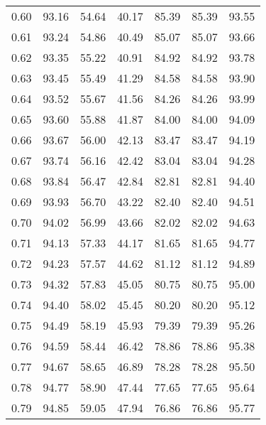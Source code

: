 \begin{tabular}{|c|c|c|c|c|c|c|}
      0.60 &     93.16 &     54.64 &      40.17 &   85.39 &      85.39 &         93.55 \\
      0.61 &     93.24 &     54.86 &      40.49 &   85.07 &      85.07 &         93.66 \\
      0.62 &     93.35 &     55.22 &      40.91 &   84.92 &      84.92 &         93.78 \\
      0.63 &     93.45 &     55.49 &      41.29 &   84.58 &      84.58 &         93.90 \\
      0.64 &     93.52 &     55.67 &      41.56 &   84.26 &      84.26 &         93.99 \\
      0.65 &     93.60 &     55.88 &      41.87 &   84.00 &      84.00 &         94.09 \\
      0.66 &     93.67 &     56.00 &      42.13 &   83.47 &      83.47 &         94.19 \\
      0.67 &     93.74 &     56.16 &      42.42 &   83.04 &      83.04 &         94.28 \\
      0.68 &     93.84 &     56.47 &      42.84 &   82.81 &      82.81 &         94.40 \\
      0.69 &     93.93 &     56.70 &      43.22 &   82.40 &      82.40 &         94.51 \\
      0.70 &     94.02 &     56.99 &      43.66 &   82.02 &      82.02 &         94.63 \\
      0.71 &     94.13 &     57.33 &      44.17 &   81.65 &      81.65 &         94.77 \\
      0.72 &     94.23 &     57.57 &      44.62 &   81.12 &      81.12 &         94.89 \\
      0.73 &     94.32 &     57.83 &      45.05 &   80.75 &      80.75 &         95.00 \\
      0.74 &     94.40 &     58.02 &      45.45 &   80.20 &      80.20 &         95.12 \\
      0.75 &     94.49 &     58.19 &      45.93 &   79.39 &      79.39 &         95.26 \\
      0.76 &     94.59 &     58.44 &      46.42 &   78.86 &      78.86 &         95.38 \\
      0.77 &     94.67 &     58.65 &      46.89 &   78.28 &      78.28 &         95.50 \\
      0.78 &     94.77 &     58.90 &      47.44 &   77.65 &      77.65 &         95.64 \\
      0.79 &     94.85 &     59.05 &      47.94 &   76.86 &      76.86 &         95.77 \\

\end{tabular}
